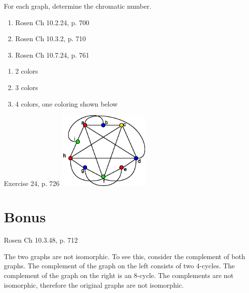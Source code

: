 \begin{questions}
 For each graph, determine the chromatic number.
\begin{enumerate}[label=(\alph*), topsep=0pt,itemsep=0pt,parsep=0pt]
    \item Rosen Ch 10.2.24, p. 700
    \item Rosen Ch 10.3.2, p. 710
    \item Rosen Ch 10.7.24, p. 761  %
\end{enumerate}
    \ifprintanswers
        \vspace{-10pt}
    \fi
    \begin{solution}
    \begin{enumerate}[label=(\alph*), topsep=0pt,itemsep=0pt,parsep=0pt]
        \item 2 colors
        \item 3 colors
        \item 4 colors, one coloring shown below
    \end{enumerate}
    Exercise 24, p. 726
    \includegraphics[width=1.8in]{figs/hw10-p22}
    \end{solution}





\section*{Bonus}




\bonusquestion[1] Rosen Ch 10.3.48, p. 712
    \ifprintanswers
        \vspace{-10pt}
    \fi
    \begin{solution}
        The two graphs are not isomorphic.  To see this, consider the complement of both graphs.  The complement of the graph on the left consists of two 4-cycles.  The complement of the graph on the right is an 8-cycle.  The complements are not isomorphic, therefore the original graphs are not isomorphic.
    \end{solution}



\end{questions}
